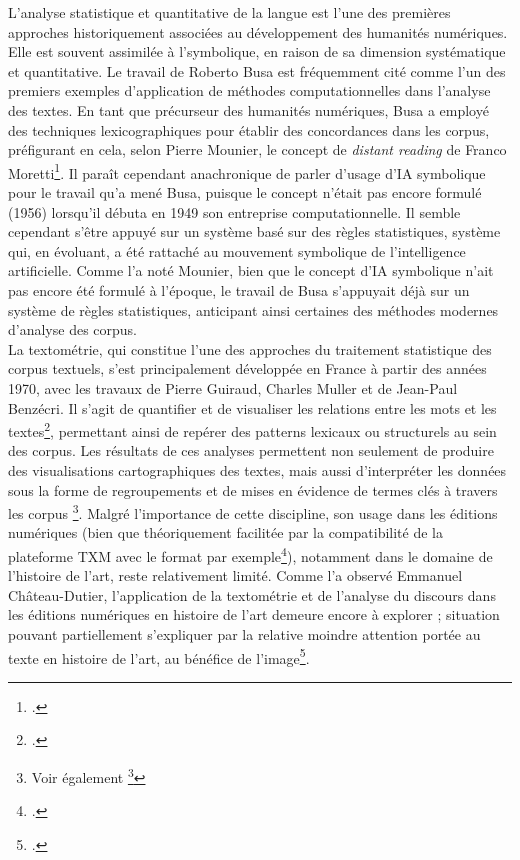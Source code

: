 L’analyse statistique et quantitative de la langue est l'une des premières approches historiquement associées au développement des humanités numériques. Elle est souvent assimilée à l'\ia symbolique, en raison de sa dimension systématique et quantitative. Le travail de Roberto Busa est fréquemment cité comme l'un des premiers exemples d'application de méthodes computationnelles dans l'analyse des textes. En tant que précurseur des humanités numériques, Busa a employé des techniques lexicographiques pour établir des concordances dans les corpus, préfigurant en cela, selon Pierre Mounier, le concept de \textit{distant reading} de Franco Moretti\footcite[paragraphe 5]{mounier_ibm_2018}. Il paraît cependant anachronique de parler d’usage d’IA symbolique pour le travail qu’a mené Busa, puisque le concept n’était pas encore formulé (1956) lorsqu’il débuta en 1949 son entreprise computationnelle. Il semble cependant s’être appuyé sur un système basé sur des règles statistiques, système qui, en évoluant, a été rattaché au mouvement symbolique de l’intelligence artificielle. Comme l'a noté Mounier, bien que le concept d'IA symbolique n'ait pas encore été formulé à l'époque, le travail de Busa s'appuyait déjà sur un système de règles statistiques, anticipant ainsi certaines des méthodes modernes d'analyse des corpus.
\newline
{}\\

La textométrie, qui constitue l’une des approches du traitement statistique des corpus textuels, s'est principalement développée en France à partir des années 1970, avec les travaux de Pierre Guiraud, Charles Muller et de Jean-Paul Benzécri. Il s’agit de quantifier et de visualiser les relations entre les mots et les textes\footcite{pincemin_quest-ce_2008}, permettant ainsi de repérer des patterns lexicaux ou structurels au sein des corpus. Les résultats de ces analyses permettent non seulement de produire des visualisations cartographiques des textes, mais aussi d'interpréter les données sous la forme de regroupements et de mises en évidence de termes clés à travers les corpus  \footnote{Voir également \footcite{pincemin_textometrie_2020}}. 
Malgré l'importance de cette discipline, son usage dans les éditions numériques (bien que théoriquement facilitée par la compatibilité de la plateforme TXM avec le format \tei par exemple\footcite{noauthor_txm_2019}), notamment dans le domaine de l'histoire de l'art, reste relativement limité. Comme l'a observé Emmanuel Château-Dutier, l'application de la textométrie et de l'analyse du discours dans les éditions numériques en histoire de l'art demeure encore à explorer ; situation pouvant partiellement s’expliquer par la relative moindre attention portée au texte en histoire de l’art, au bénéfice de l’image\footcite[p.86]{chateau-dutier_editions_2021}.
\newline
{}\\


